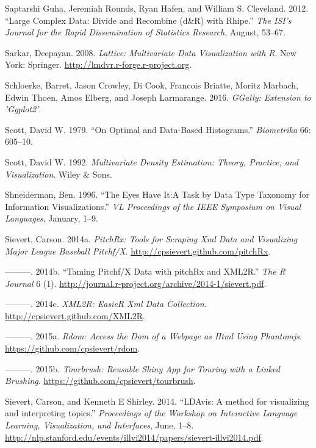 \documentclass[12pt,]{isuthesis}
\begin{document}
\hypertarget{ref-RHIPE}{}
Saptarshi Guha, Jeremiah Rounds, Ryan Hafen, and William S. Cleveland.
2012. ``Large Complex Data: Divide and Recombine (d\&R) with Rhipe.''
\emph{The ISI's Journal for the Rapid Dissemination of Statistics
Research}, August, 53--67.

\hypertarget{ref-lattice}{}
Sarkar, Deepayan. 2008. \emph{Lattice: Multivariate Data Visualization
with R}. New York: Springer. \url{http://lmdvr.r-forge.r-project.org}.

\hypertarget{ref-GGally}{}
Schloerke, Barret, Jason Crowley, Di Cook, Francois Briatte, Moritz
Marbach, Edwin Thoen, Amos Elberg, and Joseph Larmarange. 2016.
\emph{GGally: Extension to 'Ggplot2'}.

\hypertarget{ref-hist-scott}{}
Scott, David W. 1979. ``On Optimal and Data-Based Histograms.''
\emph{Biometrika} 66: 605--10.

\hypertarget{ref-mde}{}
Scott, David W. 1992. \emph{Multivariate Density Estimation: Theory,
Practice, and Visualization}. Wiley \& Sons.

\hypertarget{ref-details-on-demand}{}
Shneiderman, Ben. 1996. ``The Eyes Have It:A Task by Data Type Taxonomy
for Information Visualizations.'' \emph{VL Proceedings of the IEEE
Symposium on Visual Languages}, January, 1--9.

\hypertarget{ref-pitchRx}{}
Sievert, Carson. 2014a. \emph{PitchRx: Tools for Scraping Xml Data and
Visualizing Major League Baseball Pitchf/X}.
\url{http://cpsievert.github.com/pitchRx}.

\hypertarget{ref-Sievert:2014a}{}
---------. 2014b. ``Taming Pitchf/X Data with pitchRx and XML2R.''
\emph{The R Journal} 6 (1).
\url{http://journal.r-project.org/archive/2014-1/sievert.pdf}.

\hypertarget{ref-XML2R}{}
---------. 2014c. \emph{XML2R: EasieR Xml Data Collection}.
\url{http://cpsievert.github.com/XML2R}.

\hypertarget{ref-rdom}{}
---------. 2015a. \emph{Rdom: Access the Dom of a Webpage as Html Using
Phantomjs}. \url{https://github.com/cpsievert/rdom}.

\hypertarget{ref-tourbrush}{}
---------. 2015b. \emph{Tourbrush: Reusable Shiny App for Touring with a
Linked Brushing}. \url{https://github.com/cpsievert/tourbrush}.

\hypertarget{ref-Sievert:2014b}{}
Sievert, Carson, and Kenneth E Shirley. 2014. ``LDAvis: A method for
visualizing and interpreting topics.'' \emph{Proceedings of the Workshop
on Interactive Language Learning, Visualization, and Interfaces}, June,
1--8.
\url{http://nlp.stanford.edu/events/illvi2014/papers/sievert-illvi2014.pdf}.
\end{document}
